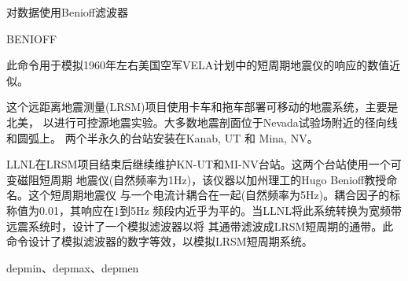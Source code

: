 \label{cmd:benioff}

对数据使用Benioff滤波器

\begin{SACSTX}
BENIOFF
\end{SACSTX}

此命令用于模拟1960年左右美国空军VELA计划中的短周期地震仪的响应的数值近似。

这个远距离地震测量(LRSM)项目使用卡车和拖车部署可移动的地震系统，主要是北美，
以进行可控源地震实验。大多数地震剖面位于Nevada试验场附近的径向线和圆弧上。
两个半永久的台站安装在Kanab, UT 和 Mina, NV。

LLNL在LRSM项目结束后继续维护KN-UT和MI-NV台站。这两个台站使用一个可变磁阻短周期
地震仪(自然频率为1Hz)，该仪器以加州理工的Hugo Benioff教授命名。这个短周期地震仪
与一个电流计耦合在一起(自然频率为5Hz)。耦合因子的标称值为0.01，其响应在1到5Hz
频段内近乎为平的。当LLNL将此系统转换为宽频带远震系统时，设计了一个模拟滤波器以将
其通带滤波成LRSM短周期的通带。此命令设计了模拟滤波器的数字等效，以模拟LRSM短周期系统。

depmin、depmax、depmen
